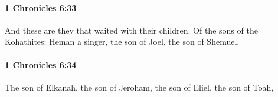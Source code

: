 		\paragraph{1 Chronicles 6:33} %
			\label{1CHRONICLES-6-33}

			And these are they that waited with their children. Of the sons of the Kohathites: Heman a singer, the son of Joel, the son of Shemuel,


		\paragraph{1 Chronicles 6:34} %
			\label{1CHRONICLES-6-34}

			The son of Elkanah, the son of Jeroham, the son of Eliel, the son of Toah,


